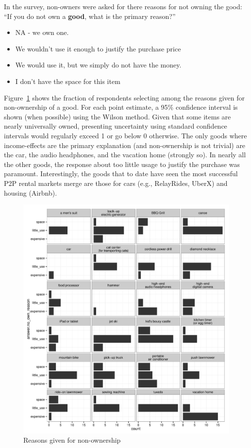 \documentclass[11pt]{article}
\begin{document}
In the survey, non-owners were asked for there reasons for not owning the good:
``If you do not own a {\bf good}, what is the primary reason?''
\begin{itemize} 
\item NA - we own one.
\item We wouldn't use it enough to justify the purchase price
\item We would use it, but we simply do not have the money.
\item I don't have the space for this item
\end{itemize} 
Figure~\ref{fig:reasons} shows the fraction of respondents selecting among the reasons given for non-ownership of a good. 
For each point estimate, a 95\% confidence interval is shown (when possible) using the Wilson method. 
Given that some items are nearly universally owned, presenting uncertainty using standard confidence intervals would regularly exceed 1 or go below 0 otherwise. 
The only goods where income-effects are the primary explanation (and non-ownership is not trivial) are the car, the audio headphones, and the vacation home (strongly so). 
In nearly all the other goods, the response about too little usage to justify the purchase was paramount. 
Interestingly, the goods that to date have seen the most successful P2P rental markets merge are those for cars (e.g., RelayRides, UberX) and housing (Airbnb). 

\begin{figure}
\centering 
\caption{Reasons given for non-ownership} 
\label{fig:reasons}
\begin{minipage}{0.90 \linewidth}
\includegraphics[width = \linewidth]{./plots/reasons.pdf} 
\end{minipage} 
\end{figure} 
\end{document}
